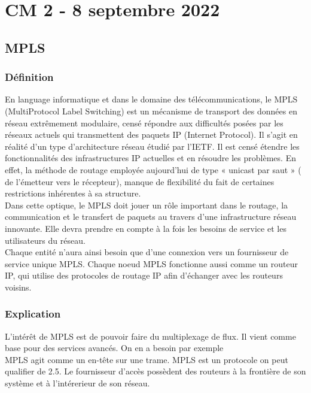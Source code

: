 \documentclass[12pt, a4paper]{article}
\begin{document}
\newpage

\section{CM 2 - 8 septembre 2022}
\subsection{MPLS}
    \subsubsection{Définition}
    En language informatique et dans le domaine des télécommunications, 
    le MPLS (MultiProtocol Label Switching) est un mécanisme de transport 
    des données en réseau extrêmement modulaire, censé répondre aux difficultés 
    posées par les réseaux actuels qui transmettent des paquets IP (Internet 
    Protocol). Il s’agit en réalité d’un type d’architecture réseau étudié 
    par l’IETF. Il est censé étendre les fonctionnalités des infrastructures 
    IP actuelles et en résoudre les problèmes. En effet, la méthode de routage 
    employée aujourd’hui de type « unicast par saut » ( de l’émetteur vers le 
    récepteur), manque de flexibilité du fait de certaines restrictions 
    inhérentes à sa structure.\\

    Dans cette optique, le MPLS doit jouer un rôle important dans le routage, 
    la communication et le transfert de paquets au travers d’une infrastructure 
    réseau innovante. Elle devra prendre en compte à la fois les besoins de 
    service et les utilisateurs du réseau.\\

    Chaque entité n’aura ainsi besoin que d’une connexion vers un fournisseur 
    de service unique MPLS. Chaque noeud MPLS fonctionne aussi comme un routeur 
    IP, qui utilise des protocoles de routage IP afin d’échanger avec les 
    routeurs voisins.\\

    \subsubsection{Explication}
    L'intérêt de MPLS est de pouvoir faire du multiplexage de flux. Il vient comme
    base pour des services avancés. On en a besoin par exemple\\

    MPLS agit comme un en-tête sur une trame. MPLS est un protocole on peut 
    qualifier de 2.5. Le fournisseur d'accès possèdent des routeurs à la frontière
    de son système et à l'intérerieur de son réseau. 
\newpage
\end{document}
